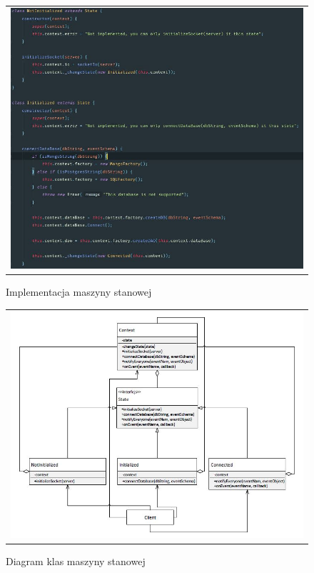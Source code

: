 \documentclass{sprawozdanie-agh}
\begin{document}
	\begin{figure}[H] 
		\centering
		\begin{tabular}{c}
			\includegraphics[width=.99\textwidth]{statemachine}
		\end{tabular} 
		\caption{Implementacja maszyny stanowej}
	\end{figure}

	\begin{figure}[H] 
		\centering
		\begin{tabular}{c}
			\includegraphics[width=.99\textwidth]{statemachineclass}
		\end{tabular} 
		\caption{Diagram klas maszyny stanowej}
	\end{figure}
\end{document}
